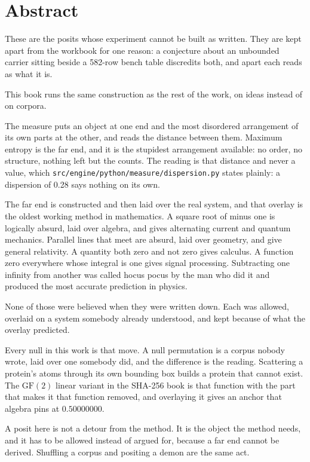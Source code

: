 \chapter*{Abstract}

These are the posits whose experiment cannot be built as written. They are kept apart from the
workbook for one reason: a conjecture about an unbounded carrier sitting beside a 582-row bench table
discredits both, and apart each reads as what it is.

This book runs the same construction as the rest of the work, on ideas instead of on corpora.

The measure puts an object at one end and the most disordered arrangement of its own parts at the
other, and reads the distance between them. Maximum entropy is the far end, and it is the stupidest
arrangement available: no order, no structure, nothing left but the counts. The reading is that
distance and never a value, which \texttt{src/\allowbreak{}engine/\allowbreak{}python/\allowbreak{}measure/\allowbreak{}dispersion.\allowbreak{}py} states plainly: a
dispersion of 0.28 says nothing on its own.

The far end is constructed and then laid over the real system, and that overlay is the oldest working
method in mathematics. A square root of minus one is logically absurd, laid over algebra, and gives
alternating current and quantum mechanics. Parallel lines that meet are absurd, laid over geometry,
and give general relativity. A quantity both zero and not zero gives calculus. A function zero
everywhere whose integral is one gives signal processing. Subtracting one infinity from another was
called hocus pocus by the man who did it and produced the most accurate prediction in physics.

None of those were believed when they were written down. Each was allowed, overlaid on a system
somebody already understood, and kept because of what the overlay predicted.

Every null in this work is that move. A null permutation is a corpus nobody wrote, laid over one
somebody did, and the difference is the reading. Scattering a protein's atoms through its own
bounding box builds a protein that cannot exist. The $\mathrm{GF}(2)$ linear variant in the SHA-256
book is that function with the part that makes it that function removed, and overlaying it gives an
anchor that algebra pins at $0.50000000$.

A posit here is not a detour from the method. It is the object the method needs, and it has to be
allowed instead of argued for, because a far end cannot be derived. Shuffling a corpus and positing
a demon are the same act.


